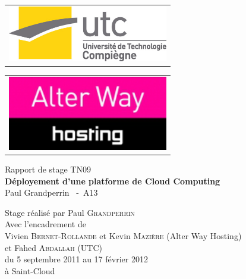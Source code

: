 \begin{titlepage}
 \begin{multicols}{2}
  \begin{flushleft}
   \begin{tabular}[l]{lrl}
    \multicolumn{3}{c}{
     \includegraphics[width=7cm]{resource/img/logo_utc}
    } \\
   \end{tabular}
  \end{flushleft}

	\begin{flushright}
		\begin{tabular}[l]{lrr}
			\multicolumn{3}{c}{
			\includegraphics[width=7cm]{resource/img/logo_awh}
			} \\
		\end{tabular}
	\end{flushright}
 \end{multicols}

 \begin{center}
  \vspace{120pt}
  \LARGE
	Rapport de stage TN09 \\
  \vspace{20pt}
  \Huge
   \textbf{Déployement d'une platforme de Cloud Computing} \\
  \vspace{20pt}
  \Large
   Paul Grandperrin ~-~A13
 \end{center}

 \vspace{160pt}
 \begin{flushright}
  \normalsize
	Stage réalisé par \large{Paul \textsc{Grandperrin}} \\
	Avec l'encadrement de \\
	\large{Vivien \textsc{Bernet-Rollande}} et \large{Kevin \textsc{Mazière}} (Alter Way Hosting)\\
	et \large{Fahed \textsc{Abdallah}} (UTC) \\
	du 5 septembre 2011 au 17 février 2012 \\
	à Saint-Cloud
 \end{flushright}
\end{titlepage}


\setcounter{page}{0}
\thispagestyle{empty}
\mbox{}
\newpage

